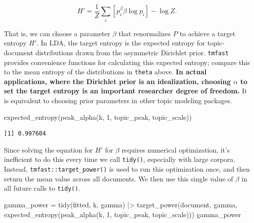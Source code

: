 \documentclass[
]{article}
\newenvironment{Shaded}{\begin{snugshade}}{\end{snugshade}}
\newcommand{\DecValTok}[1]{\textcolor[rgb]{0.68,0.00,0.00}{#1}}
\newcommand{\FunctionTok}[1]{\textcolor[rgb]{0.28,0.35,0.67}{#1}}
\newcommand{\NormalTok}[1]{\textcolor[rgb]{0.00,0.23,0.31}{#1}}
\newcommand{\OtherTok}[1]{\textcolor[rgb]{0.00,0.23,0.31}{#1}}
\newcommand{\SpecialCharTok}[1]{\textcolor[rgb]{0.37,0.37,0.37}{#1}}
\newcommand{\StringTok}[1]{\textcolor[rgb]{0.13,0.47,0.30}{#1}}
\begin{document}
\[ H' = \frac{1}{Z} \sum_i [p_i^\beta \beta \log p_i] - \log Z.\]

That is, we can choose a parameter \(\beta\) that renormalizes \(P\) to
achieve a target entropy \(H'\). In LDA, the target entropy is the
expected entropy for topic-document distributions drawn from the
asymmetric Dirichlet prior. \texttt{tmfast} provides convenience
functions for calculating this expected entropy; compare this to the
mean entropy of the distributions in \texttt{theta} above. \textbf{In
actual applications, where the Dirichlet prior is an idealization,
choosing \(\alpha\) to set the target entropy is an important researcher
degree of freedom.} It is equivalent to choosing prior parameters in
other topic modeling packages.

\begin{Shaded}
\begin{Highlighting}[]
\FunctionTok{expected\_entropy}\NormalTok{(}\FunctionTok{peak\_alpha}\NormalTok{(k, }\DecValTok{1}\NormalTok{, topic\_peak, topic\_scale))}
\end{Highlighting}
\end{Shaded}

\begin{verbatim}
[1] 0.997604
\end{verbatim}

Since solving the equation for \(H'\) for \(\beta\) requires numerical
optimization, it's inefficient to do this every time we call
\texttt{tidy()}, especially with large corpora. Instead,
\texttt{tmfast::target\_power()} is used to run this optimization once,
and then return the mean value across all documents. We then use this
single value of \(\beta\) in all future calls to \texttt{tidy()}.

\begin{Shaded}
\begin{Highlighting}[]
\NormalTok{gamma\_power }\OtherTok{=} \FunctionTok{tidy}\NormalTok{(fitted, k, }\StringTok{\textquotesingle{}gamma\textquotesingle{}}\NormalTok{) }\SpecialCharTok{|\textgreater{}} 
    \FunctionTok{target\_power}\NormalTok{(document, gamma, }
                 \FunctionTok{expected\_entropy}\NormalTok{(}\FunctionTok{peak\_alpha}\NormalTok{(k, }
                                             \DecValTok{1}\NormalTok{, }
\NormalTok{                                             topic\_peak, }
\NormalTok{                                             topic\_scale)))}
\NormalTok{gamma\_power}
\end{Highlighting}
\end{Shaded}
\end{document}
